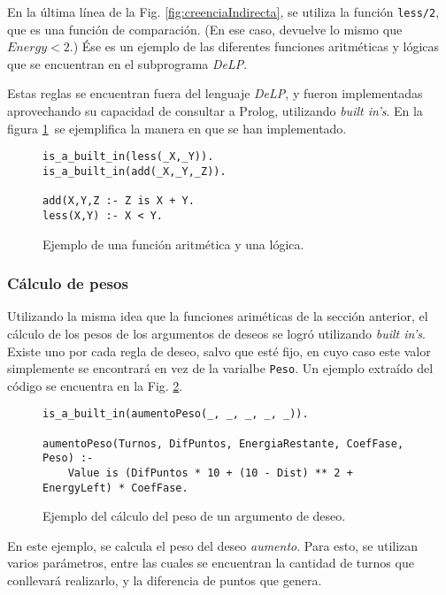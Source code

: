 \documentclass[oneside]{book}
\begin{document}
En la última línea de la Fig. \ref{fig:creenciaIndirecta}, se utiliza la función 
\texttt{less/2}, que es una función de comparación. (En ese caso, devuelve lo mismo
que $Energy < 2$.) Ése es un ejemplo de las diferentes funciones aritméticas y 
lógicas que se encuentran en el subprograma \textit{DeLP}.

Estas reglas se encuentran fuera del lenguaje \textit{DeLP}, y fueron implementadas 
aprovechando su capacidad de consultar a Prolog, utilizando \textit{built in's}.
En la figura \ref{fig:funciones}\ se ejemplifica la manera en que se han 
implementado.

\begin{figure}
\begin{verbatim}    
is_a_built_in(less(_X,_Y)).
is_a_built_in(add(_X,_Y,_Z)).

add(X,Y,Z :- Z is X + Y.
less(X,Y) :- X < Y.
\end{verbatim}

\caption{Ejemplo de una función aritmética y una lógica.}
\label{fig:funciones}
\end{figure}

\subsubsection{Cálculo de pesos}

Utilizando la misma idea que la funciones ariméticas de la sección anterior, el
cálculo de los pesos de los argumentos de deseos se logró utilizando \textit{built 
in's}. Existe uno por cada regla de deseo, salvo que esté fijo, en cuyo caso 
este valor simplemente se encontrará en vez de la varialbe \texttt{Peso}. Un 
ejemplo extraído del código se encuentra en la Fig. \ref{fig:calculoDePeso}.

\begin{figure}
\begin{verbatim}
is_a_built_in(aumentoPeso(_, _, _, _, _)).

aumentoPeso(Turnos, DifPuntos, EnergiaRestante, CoefFase, Peso) :-
    Value is (DifPuntos * 10 + (10 - Dist) ** 2 + EnergyLeft) * CoefFase.
\end{verbatim}

\caption{Ejemplo del cálculo del peso de un argumento de deseo.}
\label{fig:calculoDePeso}
\end{figure}

En este ejemplo, se calcula el peso del deseo \emph{aumento}. Para esto, se utilizan
varios parámetros, entre las cuales se encuentran la cantidad de turnos que 
conllevará realizarlo, y la diferencia de puntos que genera.
\end{document}
